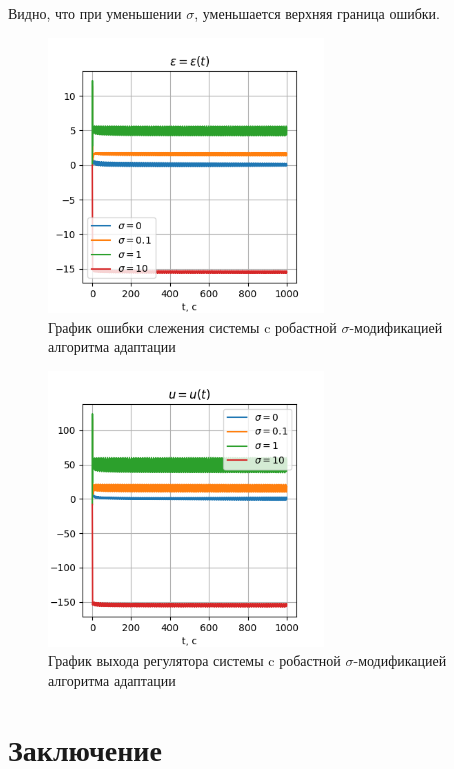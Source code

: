\documentclass{article}
\begin{document}
Видно, что при уменьшении $\sigma$, уменьшается верхняя граница ошибки.

\begin{figure}[h!]
  \centering
  \includegraphics[width=0.65\textwidth]{figs/3_epsilon.png}
  \caption{График ошибки слежения системы c робастной $\sigma$-модификацией алгоритма адаптации} 
  \label{fig:3_epsilon}
\end{figure}

\begin{figure}[h!]
  \centering
  \includegraphics[width=0.65\textwidth]{figs/3_u.png}
  \caption{График выхода регулятора системы c робастной $\sigma$-модификацией алгоритма адаптации} 
  \label{fig:3_u}
\end{figure}

\FloatBarrier
\section{Заключение}
\end{document}
